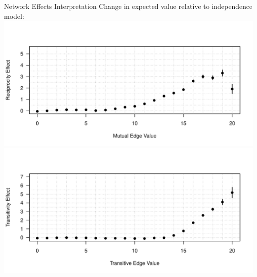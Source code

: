 \documentclass{beamer}
\begin{document}
\begin{frame}{Network Effects Interpretation}
Change in expected value relative to independence model:
\centering
  \includegraphics[scale=.45, clip=true, trim=0cm .5cm 0cm 1.9cm]{slides_figures/mutualInterpretation.pdf}\vfill
   \includegraphics[scale=.45, clip=true, trim=0cm .5cm 0cm 1.9cm]{slides_figures/transitiveInterpretation.pdf}

\end{frame}
\end{document}
